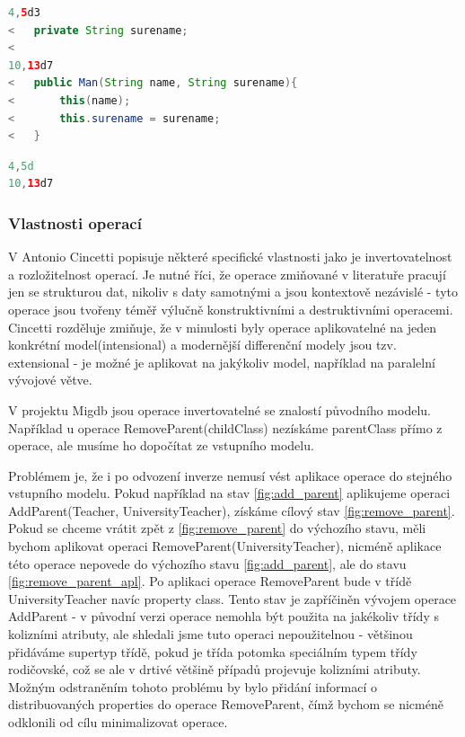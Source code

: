 \documentclass[11pt,twoside,a4paper]{book}
\begin{document}
\begin{lstlisting}[language=JAVA,frame=single,caption=diff
modelů 2 a 1,label=reverse_add_1_2] 
4,5d3
< 	private String surename;
< 
10,13d7
< 	public Man(String name, String surename){
< 		this(name);
< 		this.surename = surename;
< 	}
\end{lstlisting}

\begin{lstlisting}[language=JAVA,frame=single,caption=diff
modelů 2 a 1,label=delete_minimal] 
4,5d
10,13d7
\end{lstlisting}

\subsubsection{Vlastnosti operací}
V \cite{Cincetti} Antonio Cincetti popisuje některé specifické vlastnosti
jako je invertovatelnost a rozložitelnost operací. Je nutné říci, že operace
zmiňované v literatuře pracují jen se strukturou dat, nikoliv s daty samotnými a jsou
kontextově nezávislé - tyto operace jsou tvořeny téměř výlučně konstruktivními
a  destruktivními operacemi. Cincetti rozděluje zmiňuje, že v
minulosti byly operace aplikovatelné na jeden konkrétní model(intensional) a
modernější differenční modely jsou tzv. extensional - je možné je aplikovat na
jakýkoliv model, například na paralelní vývojové větve.

V projektu Migdb jsou operace invertovatelné se znalostí původního modelu.
Například u operace RemoveParent(childClass) nezískáme parentClass přímo z
operace, ale musíme ho dopočítat ze vstupního modelu.

Problémem je, že i po odvození inverze nemusí vést aplikace operace do stejného
vstupního modelu. Pokud například na stav \ref{fig:add_parent} aplikujeme
operaci AddParent(Teacher, UniversityTeacher), získáme cílový stav
\ref{fig:remove_parent}. Pokud se chceme vrátit zpět z \ref{fig:remove_parent}
do výchozího stavu, měli bychom aplikovat operaci
RemoveParent(UniversityTeacher), nicméně aplikace této operace nepovede do
výchozího stavu \ref{fig:add_parent}, ale do stavu \ref{fig:remove_parent_apl}.
Po aplikaci operace RemoveParent bude v třídě UniversityTeacher navíc property
class. Tento stav je zapříčiněn vývojem operace AddParent - v původní verzi
operace nemohla být použita na jakékoliv třídy s kolizními atributy, ale
shledali jsme tuto operaci nepoužitelnou - většinou přidáváme supertyp třídě,
pokud je třída potomka speciálním typem třídy rodičovské, což se ale v
drtivé většině případů projevuje kolizními atributy. Možným odstraněním tohoto
problému by bylo přidání informací o distribuovaných properties do operace
RemoveParent, čímž bychom se nicméně odklonili od cílu minimalizovat operace.
\end{document}
